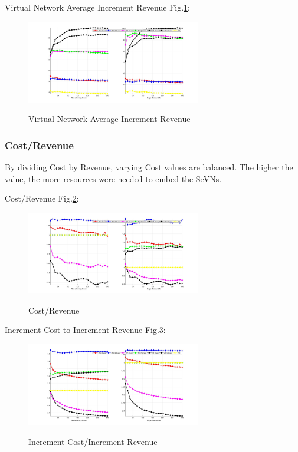 Virtual Network Average Increment Revenue Fig.\ref{fig:RevenueAccumulateAverageVirtualNetwork}:
\begin{figure}[htbp]
  \centering
  \includegraphics[width=3in]{Fig/RevenueAccumulateAverageVirtualNetwork}\\
  \caption{Virtual Network Average Increment Revenue}\label{fig:RevenueAccumulateAverageVirtualNetwork}
\end{figure}


\subsubsection{Cost/Revenue}
By dividing Cost by Revenue, varying Cost values are balanced. The higher the value, the more resources were needed to embed the SeVNs.

Cost/Revenue Fig.\ref{fig:CostRevenue}:
\begin{figure}[htbp]
  \centering
  \includegraphics[width=3in]{Fig/CostRevenue}\\
  \caption{Cost/Revenue}\label{fig:CostRevenue}
\end{figure}

Increment Cost to Increment Revenue Fig.\ref{fig:CostRevenueAccumulate}:
\begin{figure}[htbp]
  \centering
  \includegraphics[width=3in]{Fig/CostRevenueAccumulate}\\
  \caption{Increment Cost/Increment Revenue}\label{fig:CostRevenueAccumulate}
\end{figure}



